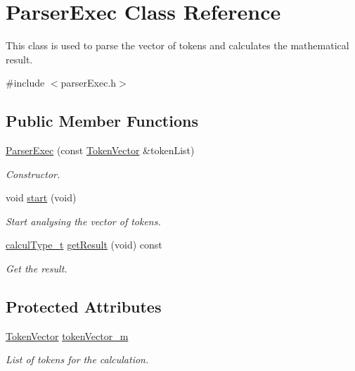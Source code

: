 \hypertarget{class_parser_exec}{}\section{Parser\+Exec Class Reference}
\label{class_parser_exec}


This class is used to parse the vector of tokens and calculates the mathematical result.  




{\ttfamily \#include $<$parser\+Exec.\+h$>$}

\subsection*{Public Member Functions}
\begin{DoxyCompactItemize}
\item 
\hyperlink{class_parser_exec_a865378c0f6a301dd4bffd870512167e2}{Parser\+Exec} (const \hyperlink{token_8h_ab47f31774188c3fad94acfd21e12c917}{Token\+Vector} \&token\+List)
\begin{DoxyCompactList}\small\item\em Constructor. \end{DoxyCompactList}\item 
\hypertarget{class_parser_exec_aa00f3c5f1f4ea46e1c6aafebff8d4e9f}{}void \hyperlink{class_parser_exec_aa00f3c5f1f4ea46e1c6aafebff8d4e9f}{start} (void)\label{class_parser_exec_aa00f3c5f1f4ea46e1c6aafebff8d4e9f}

\begin{DoxyCompactList}\small\item\em Start analysing the vector of tokens. \end{DoxyCompactList}\item 
\hyperlink{mpfr_interface_8h_a993860352aef57b15399903c4475a608}{calcul\+Type\+\_\+t} \hyperlink{class_parser_exec_a4cb35c20c400f26f8894a743663ce733}{get\+Result} (void) const 
\begin{DoxyCompactList}\small\item\em Get the result. \end{DoxyCompactList}\end{DoxyCompactItemize}
\subsection*{Protected Attributes}
\begin{DoxyCompactItemize}
\item 
\hypertarget{class_parser_exec_a56bfa666d473614fa26a484036897183}{}\hyperlink{token_8h_ab47f31774188c3fad94acfd21e12c917}{Token\+Vector} \hyperlink{class_parser_exec_a56bfa666d473614fa26a484036897183}{token\+Vector\+\_\+m}\label{class_parser_exec_a56bfa666d473614fa26a484036897183}

\begin{DoxyCompactList}\small\item\em List of tokens for the calculation. \end{DoxyCompactList}\end{DoxyCompactItemize}



